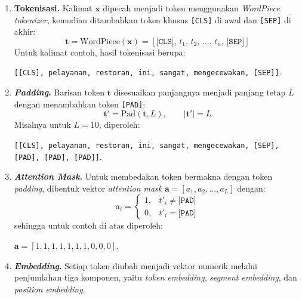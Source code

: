\begin{enumerate}
    \item \textbf{Tokenisasi.} Kalimat $\mathbf{x}$ dipecah menjadi token menggunakan \textit{WordPiece tokenizer}, kemudian ditambahkan token khusus \texttt{[CLS]} di awal dan \texttt{[SEP]} di akhir:
    \begin{equation}
        \mathbf{t} = \text{WordPiece}(\mathbf{x})
        = [\texttt{[CLS]},\, t_1,\, t_2,\, \ldots,\, t_n,\, \texttt{[SEP]}]
        \label{eq:tokenisasi}
    \end{equation}
    \noindent Untuk kalimat contoh, hasil tokenisasi berupa:
    \begin{center}
        \texttt{[[CLS], pelayanan, restoran, ini, sangat, mengecewakan, [SEP]]}.
    \end{center}

    \item \textbf{\textit{Padding}.} Barisan token $\mathbf{t}$ disesuaikan panjangnya menjadi panjang tetap $L$ dengan menambahkan token \texttt{[PAD]}:
    \begin{equation}
        \mathbf{t}' = \text{Pad}(\mathbf{t}, L), \qquad |\mathbf{t}'| = L
        \label{eq:padding}
    \end{equation}
    \noindent Misalnya untuk $L = 10$, diperoleh:
    \begin{center}
        \texttt{[[CLS], pelayanan, restoran, ini, sangat, mengecewakan, [SEP],
        [PAD], [PAD], [PAD]]}.
    \end{center}

    \item \textbf{\textit{Attention Mask}.} Untuk membedakan token bermakna dengan token \textit{padding}, dibentuk vektor \textit{attention mask} $\mathbf{a} = [a_1, a_2, \ldots, a_L]$ dengan:
    \begin{equation}
        a_i =
        \begin{cases}
            1, & t'_i \neq \texttt{[PAD]} \\
            0, & t'_i = \texttt{[PAD]}
        \end{cases}
        \label{eq:attention_mask}
    \end{equation}
    \noindent sehingga untuk contoh di atas diperoleh:
    \begin{center}
        $\mathbf{a} = [1, 1, 1, 1, 1, 1, 1, 0, 0, 0]$.
    \end{center}

   \item \textbf{\textit{Embedding}.} Setiap token diubah menjadi vektor numerik melalui penjumlahan tiga komponen, yaitu \textit{token embedding}, \textit{segment embedding}, dan \textit{position embedding}.


\end{enumerate}
